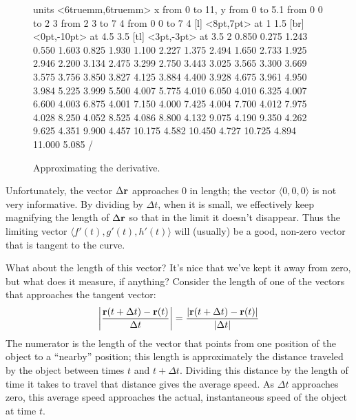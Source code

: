 \begin{figure}[H]
\centerline{
\vbox{\beginpicture
\normalgraphs
\setcoordinatesystem units <6truemm,6truemm>
\setplotarea x from 0 to 11, y from 0 to 5.1
\arrow <5pt> [0.17, 0.5] from 0 0 to 2 3
\arrow <5pt> [0.17, 0.5] from 2 3 to 7 4
\arrow <5pt> [0.17, 0.5] from 0 0 to 7 4
 [l] <8pt,7pt> at 1 1.5
 [br] <0pt,-10pt> at 4.5 3.5
 [tl]
  <3pt,-3pt> at 3.5 2
\setquadratic
 0.850 0.275 1.243 0.550 1.603 0.825 1.930 1.100 2.227 
1.375 2.494 1.650 2.733 1.925 2.946 2.200 3.134 2.475 3.299 
2.750 3.443 3.025 3.565 3.300 3.669 3.575 3.756 3.850 3.827 
4.125 3.884 4.400 3.928 4.675 3.961 4.950 3.984 5.225 3.999 
5.500 4.007 5.775 4.010 6.050 4.010 6.325 4.007 6.600 4.003 
6.875 4.001 7.150 4.000 7.425 4.004 7.700 4.012 7.975 4.028 
8.250 4.052 8.525 4.086 8.800 4.132 9.075 4.190 9.350 4.262 
9.625 4.351 9.900 4.457 10.175 4.582 10.450 4.727 10.725 4.894 
11.000 5.085 /
\endpicture}}
\caption{Approximating the derivative. \label{fig:vector derivative}}
\end{figure}

Unfortunately, the vector $\Delta{\bf r}$ approaches 0 in length; the
vector $\langle 0,0,0\rangle$ is not very informative. By dividing by
$\Delta t$, when it is small, we effectively keep magnifying the
length of $\Delta{\bf r}$ so that in the limit it doesn't disappear. Thus the
limiting vector $\langle f'(t),g'(t),h'(t)\rangle$ will (usually) be a
good, non-zero vector that is tangent to the curve.

What about the length of this vector? It's nice that we've kept it
away from zero, but what does it measure, if anything?
Consider the length of one of the vectors that approaches the tangent
vector:
$$\left|{{\bf r}(t+\Delta t)-{\bf r}(t)\over
\Delta t}\right|={|{\bf r}(t+\Delta t)-{\bf r}(t)|\over|\Delta t|}$$
The numerator is the length of the vector that points from one position
of the object to a ``nearby'' position; this length is approximately
the distance traveled by the object between times $t$ and $t+\Delta
t$. Dividing this distance by the length of time it takes to travel
that distance gives the average speed. As $\Delta t$ approaches zero,
this average speed approaches the actual, instantaneous speed of the
object at time $t$. 

